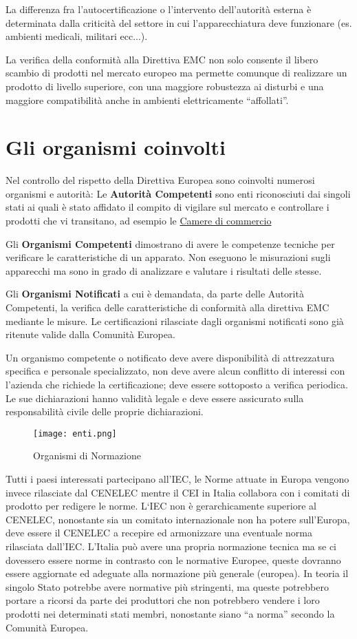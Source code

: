 La differenza fra l'autocertificazione o l'intervento dell'autorità esterna è determinata dalla criticità del settore
in cui l'apparecchiatura deve funzionare (es. ambienti medicali, militari ecc...).

La verifica della conformità alla Direttiva EMC non solo consente il libero scambio di prodotti nel mercato europeo
ma permette comunque di realizzare un prodotto di livello superiore, con una maggiore robustezza ai disturbi e una
maggiore compatibilità anche in ambienti elettricamente ``affollati''.

\section{Gli organismi coinvolti}
Nel controllo del rispetto della Direttiva Europea sono coinvolti numerosi organismi e autorità:
Le \textbf{Autorità Competenti} sono enti riconosciuti dai singoli stati ai quali è stato affidato il compito
di vigilare sul mercato e controllare i prodotti che vi transitano, ad esempio le \underline{Camere di commercio}

Gli \textbf{Organismi Competenti} dimostrano di avere le competenze tecniche per verificare le caratteristiche di un 
apparato. Non eseguono le misurazioni sugli apparecchi ma sono in grado di analizzare e valutare
i risultati delle stesse.

Gli \textbf{Organismi Notificati} a cui è demandata, da parte delle Autorità Competenti, la verifica delle
caratteristiche di conformità alla direttiva EMC mediante le misure. Le certificazioni rilasciate dagli organismi
notificati sono già ritenute valide dalla Comunità Europea.

Un organismo competente o notificato deve avere disponibilità di attrezzatura specifica e personale specializzato,
non deve avere alcun conflitto di interessi con l'azienda che richiede la certificazione; deve essere sottoposto a 
verifica periodica. Le sue dichiarazioni hanno validità legale e deve essere assicurato sulla responsabilità civile
delle proprie dichiarazioni.

\begin{figure}[h]
 \texttt{[image: enti.png]}
 \centering
 \caption{Organismi di Normazione}
 \label{fig:enti}
\end{figure}

Tutti i paesi interessati partecipano all'IEC, le Norme attuate in Europa vengono invece rilasciate dal CENELEC mentre
il CEI in Italia collabora con i comitati di prodotto per redigere le norme.
L`IEC non è gerarchicamente superiore al CENELEC, nonostante sia un comitato internazionale non ha potere
sull'Europa, deve essere il CENELEC a recepire ed armonizzare una eventuale norma rilasciata dall'IEC.
L'Italia può avere una propria normazione tecnica ma se ci dovessero essere norme in contrasto con le normative 
Europee, queste dovranno essere aggiornate ed adeguate alla normazione più generale (europea). In teoria il singolo
Stato potrebbe avere normative più stringenti, ma queste potrebbero portare a ricorsi da parte dei produttori
che non potrebbero vendere i loro prodotti nei determinati stati membri, nonostante siano ``a norma''
secondo la Comunità Europea.




